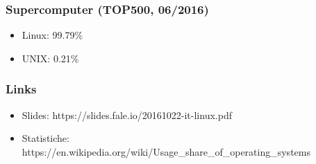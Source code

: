 \documentclass[t,aspectratio=169]{beamer}
\begin{document}
\begin{frame}
    \frametitle{Supercomputer (TOP500, 06/2016)}
    \begin{itemize}
        \item<2-> Linux: 99.79\%
        \item<2-> UNIX: 0.21\%
    \end{itemize}
\end{frame}

\begin{frame}
    \frametitle{Links}
    \begin{itemize}
        \item Slides: https://slides.fale.io/20161022-it-linux.pdf
        \item Statistiche: https://en.wikipedia.org/wiki/Usage\_share\_of\_operating\_systems
    \end{itemize}
\end{frame}

\makethanks
\end{document}
